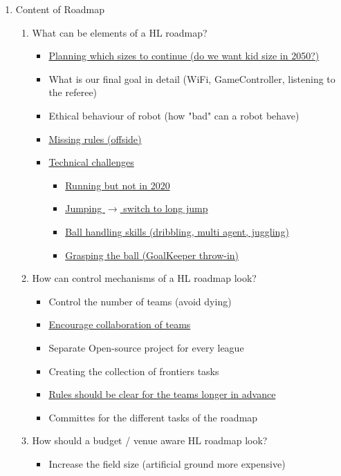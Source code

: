 \documentclass{article}
\begin{document}
\begin{enumerate} 
   \item Content of Roadmap
   \begin{enumerate} 
       \item What can be elements of a HL roadmap?
       \begin{itemize} 
           \item \underline{Planning which sizes to continue  (do we want kid size in 2050?)}
           \item What is our final goal in detail (WiFi, GameController, listening to the referee)
           \item Ethical behaviour of robot (how "bad" can a robot behave)
           \item \underline{Missing rules (offside)}
           \item \underline{Technical challenges}
           \begin{itemize} 
               \item \underline{Running but not in 2020}
               \item \underline{Jumping $\rightarrow$ switch to long jump}
               \item \underline{Ball handling skills (dribbling, multi agent, juggling)}
               \item \underline{Grasping the ball (GoalKeeper throw-in)}
   \end{itemize}
   \end{itemize}
       \item How can control mechanisms of a HL roadmap look?
       \begin{itemize} 
           \item Control the number of teams (avoid dying)
           \item \underline{Encourage collaboration of teams}
           \item Separate Open-source project for every league
           \item Creating the collection of frontiers tasks
           \item \underline{Rules should be clear for the teams longer in advance}
           \item Committes for the different tasks of the roadmap
   \end{itemize}
       \item How should a budget / venue aware HL roadmap look?
       \begin{itemize} 
           \item Increase the field size (artificial ground more expensive)

\end{itemize}
\end{enumerate}
\end{enumerate}
\end{document}
